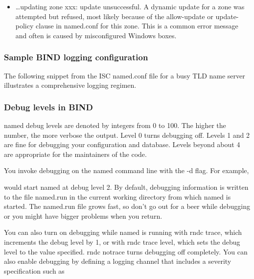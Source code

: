 
\begin{itemize}
\item
  { \ldots updating zone xxx: update unsuccessful. }A dynamic update for
  a zone was attempted but refused, most likely because of the
  {allow-update} or {update-policy} clause in {named.conf} for this
  zone. This is a common error message and often is caused by
  misconfigured Windows boxes.
\end{itemize}

\subsubsection[Sample BIND logging
configuration]{\texorpdfstring{\protect\hypertarget{part0024_split_070.htmlux5cux23_idTextAnchor962}{}{}Sample
BIND logging configuration}{Sample BIND logging configuration}}

The following snippet from the ISC {named.conf }file for a busy TLD name
server illustrates a comprehensive logging regimen.


\subsubsection[Debug levels in
BIND]{\texorpdfstring{\protect\hypertarget{part0024_split_070.htmlux5cux23_idTextAnchor963}{}{}Debug
levels in BIND}{Debug levels in BIND}}

\protect\hypertarget{part0024_split_070.htmlux5cux23_idIndexMarker2291}{}{}{named}
debug levels are denoted by integers from 0 to 100. The higher the
number, the more verbose the output. Level 0 turns debugging off. Levels
1 and 2 are fine for debugging your configuration and database. Levels
beyond about 4 are appropriate for the maintainers of the code.

You invoke debugging on the {named} command line with the {-d} flag. For
example,


would start {named} at debug level 2. By default, debugging information
is written to the file {named.run} in the current working directory from
which {named} is started. The {named.run} file grows fast, so don't go
out for a beer while debugging or you might have bigger problems when
you return.

You can also turn on debugging while {named} is running with {rndc
trace}, which increments the debug level by 1, or with {rndc trace
}{level,}{ }which sets the debug level to the value specified. {rndc
notrace} turns debugging off completely. You can also enable debugging
by defining a logging channel that includes a severity specification
such as

